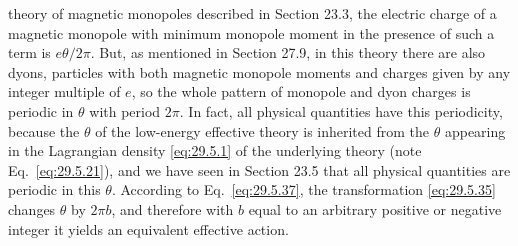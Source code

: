 theory of magnetic monopoles described in Section 23.3, the electric charge
of a magnetic monopole with minimum monopole moment in the presence of such
a term is \(e\theta/2\pi\). But, as mentioned in Section 27.9, in this theory
there are also dyons, particles with both magnetic monopole moments and
charges given by any integer multiple of \(e\), so the whole pattern of
monopole and dyon charges is periodic in \(\theta\) with period \(2\pi\). In
fact, all physical quantities have this periodicity, because the \(\theta\)
of the low-energy effective theory is inherited from the \(\theta\) appearing
in the Lagrangian density \eqref{eq:29.5.1} of the underlying theory (note
Eq.~\eqref{eq:29.5.21}), and we have seen in Section 23.5 that all physical
quantities are periodic in this \(\theta\). According to
Eq.~\eqref{eq:29.5.37}, the transformation \eqref{eq:29.5.35} changes
\(\theta\) by \(2\pi b\), and therefore with \(b\) equal to an arbitrary
positive or negative integer it yields an equivalent effective action.

